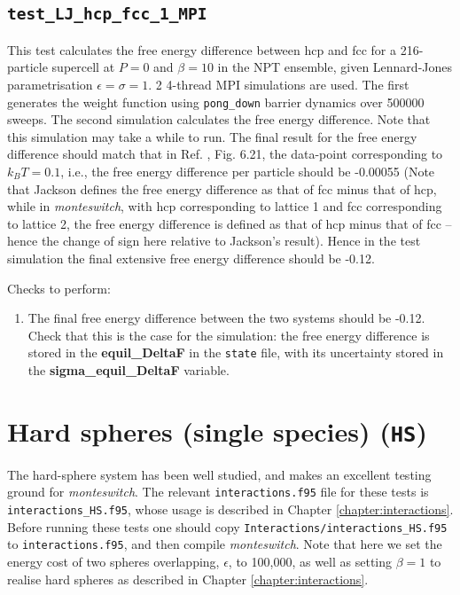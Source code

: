 \documentclass{report}
\begin{document}
\subsection{\texttt{test\_LJ\_hcp\_fcc\_1\_MPI}}
This test calculates the free energy difference between hcp and fcc for a 216-particle supercell at $P=0$ and
$\beta=10$ in the NPT ensemble, given Lennard-Jones parametrisation $\epsilon=\sigma=1$. 2 4-thread MPI simulations are used. 
The first generates the weight function using \texttt{pong\_down} barrier dynamics over 500000 sweeps. The second simulation calculates 
the free energy difference. Note that this simulation may take a while to run. The final result for the free energy difference
should match that in Ref. \cite{thesis:Jackson}, Fig. 6.21, the data-point corresponding to $k_BT=0.1$, i.e.,
the free energy difference per particle should be -0.00055 (Note that Jackson defines the free energy difference as
that of fcc minus that of hcp, while in \emph{monteswitch}, with hcp corresponding to lattice 1 and fcc corresponding to
lattice 2, the free energy difference is defined as that of hcp minus that of fcc -- hence the change of sign here
relative to Jackson's result). Hence in the test simulation the final extensive free energy difference should be -0.12.

Checks to perform:
\begin{enumerate}
\item
The final free energy difference between the two systems should be -0.12. Check that this is the case for the
simulation: the free energy difference is stored in the \textbf{equil\_DeltaF} in the \texttt{state} file, with its uncertainty
stored in the \textbf{sigma\_equil\_DeltaF} variable.
\end{enumerate}


\section{Hard spheres (single species) (\texttt{HS})}
The hard-sphere system has been well studied, and makes an excellent testing ground for \emph{monteswitch}.
The relevant \texttt{interactions.f95} file for these tests is \texttt{interactions\_HS.f95}, whose usage is described in Chapter
\ref{chapter:interactions}. Before running these tests one should copy \texttt{Interactions/interactions\_HS.f95}
to \texttt{interactions.f95}, and then compile \emph{monteswitch}. Note that here we set the energy cost of two spheres overlapping,
$\epsilon$, to 100,000, as well as setting $\beta=1$ to realise hard spheres as described in Chapter \ref{chapter:interactions}.
\end{document}
